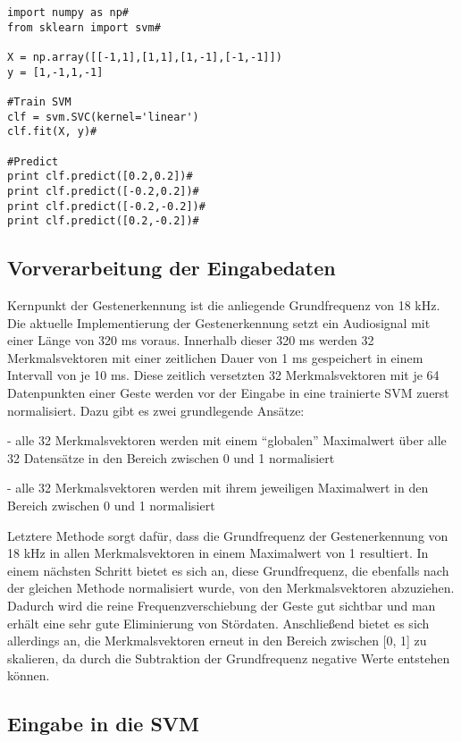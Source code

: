 \begin{lstlisting}
import numpy as np#
from sklearn import svm#

X = np.array([[-1,1],[1,1],[1,-1],[-1,-1]])
y = [1,-1,1,-1]

#Train SVM
clf = svm.SVC(kernel='linear')
clf.fit(X, y)#

#Predict
print clf.predict([0.2,0.2])#
print clf.predict([-0.2,0.2])#
print clf.predict([-0.2,-0.2])#
print clf.predict([0.2,-0.2])#
\end{lstlisting}


\subsection{Vorverarbeitung der Eingabedaten}

Kernpunkt der Gestenerkennung ist die anliegende Grundfrequenz von 18 kHz. 
Die aktuelle Implementierung der Gestenerkennung setzt ein Audiosignal mit einer Länge von 320 ms voraus. 
Innerhalb dieser 320 ms werden 32 Merkmalsvektoren mit einer zeitlichen Dauer von 1 ms gespeichert in einem Intervall von je 10 ms. 
Diese zeitlich versetzten 32 Merkmalsvektoren mit je 64 Datenpunkten einer Geste werden vor der Eingabe in eine trainierte SVM zuerst normalisiert. 
Dazu gibt es zwei grundlegende Ansätze:

- alle 32 Merkmalsvektoren werden mit einem “globalen” Maximalwert über alle 32 Datensätze in den Bereich zwischen 0 und 1 normalisiert\newline

- alle 32 Merkmalsvektoren werden mit ihrem jeweiligen Maximalwert in den Bereich zwischen 0 und 1 normalisiert

Letztere Methode sorgt dafür, dass die Grundfrequenz der Gestenerkennung von 18 kHz in allen Merkmalsvektoren in einem Maximalwert von 1 resultiert. 
In einem nächsten Schritt bietet es sich an, diese Grundfrequenz, die ebenfalls nach der gleichen Methode normalisiert wurde, von den Merkmalsvektoren abzuziehen. 
Dadurch wird die reine Frequenzverschiebung der Geste gut sichtbar und man erhält eine sehr gute Eliminierung von Stördaten. 
Anschließend bietet es sich allerdings an, die Merkmalsvektoren erneut in den Bereich zwischen [0, 1] zu skalieren, da durch die Subtraktion der Grundfrequenz negative Werte entstehen können.


\subsection{Eingabe in die SVM}

